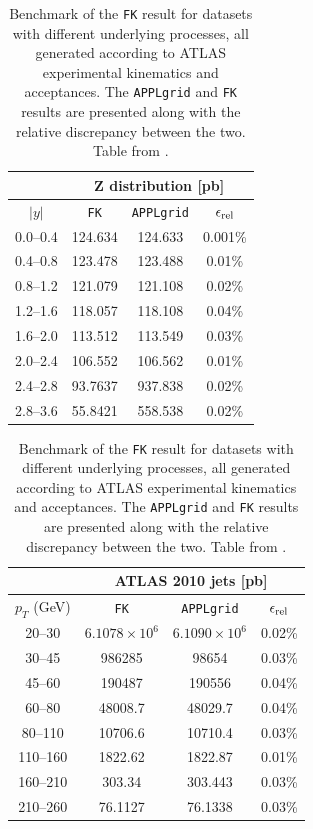 \begin{table}[ht!]
\begin{center}
 \begin{tabular}{c|c|c|c|}
 \cline{2-4}
   & \multicolumn{3}{|c|}{Z distribution [pb]}  \\
    \hline
\multicolumn{1}{|c||}{$|y|$} & {\tt FK}	  &    {\tt APPLgrid}  &   $\epsilon_{\rm rel}$\\
\hline
\multicolumn{1}{|c||}{0.0--0.4} & 124.634 & 124.633 & 0.001\%\\
\multicolumn{1}{|c||}{0.4--0.8} & 123.478 & 123.488 & 0.01\%\\
\multicolumn{1}{|c||}{0.8--1.2} & 121.079 & 121.108 & 0.02\%\\
\multicolumn{1}{|c||}{1.2--1.6} & 118.057 & 118.108 & 0.04\%\\
\multicolumn{1}{|c||}{1.6--2.0} & 113.512 & 113.549 & 0.03\%\\
\multicolumn{1}{|c||}{2.0--2.4} & 106.552 & 106.562 & 0.01\%\\
\multicolumn{1}{|c||}{2.4--2.8} & 93.7637 & 937.838 & 0.02\%\\
\multicolumn{1}{|c||}{2.8--3.6} & 55.8421 & 558.538 & 0.02\%\\
\hline
 \end{tabular}
 
  \vspace{2mm}
  
\begin{tabular}{c|c|c|c|}
\cline{2-4}
   & \multicolumn{3}{|c|}{ATLAS 2010 jets [pb]}  \\
    \hline
\multicolumn{1}{|c||}{$p_T$ (GeV)} & {\tt FK}	  &    {\tt APPLgrid}  &    $\epsilon_{\rm rel}$ \\
\hline
\multicolumn{1}{|c||}{20--30}   & $6.1078 \times 10^6$ & $6.1090 \times 10^6$ &	0.02\% \\
\multicolumn{1}{|c||}{30--45}   & 986285 	                     & 98654      & 0.03\% \\
\multicolumn{1}{|c||}{45--60}   & 190487 	                     & 190556    & 0.04\% \\
\multicolumn{1}{|c||}{60--80}   & 48008.7 	                     & 48029.7   & 0.04\% \\
\multicolumn{1}{|c||}{80--110} & 10706.6 	                     & 10710.4   & 0.03\% \\
\multicolumn{1}{|c||}{110--160} & 1822.62 			  & 1822.87   & 0.01\% \\
\multicolumn{1}{|c||}{160--210} & 303.34 			  & 303.443   & 0.03\% \\
\multicolumn{1}{|c||}{210--260} & 76.1127 			  & 76.1338   & 0.03\% \\
\hline
 \end{tabular}

 \end{center}
\caption[Benchmark of the {\tt FK} result for datasets with different underlying processes]{ Benchmark of the {\tt FK} result for datasets with different underlying processes, all generated according to ATLAS experimental kinematics and acceptances. The { \tt APPLgrid} and {\tt FK} results are presented along with the relative discrepancy between the two. Table from \cite{Ball:2012cx}.\label{tab:fkbenchatlasjet} }
\end{table}


